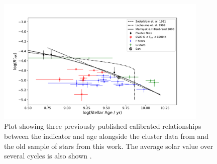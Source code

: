 \begin{figure}
    \centering
    \includegraphics[width=0.9\textwidth]{Figures/4-Chromospheric_age/ca_results_3_relationship.pdf}
    \caption[Comparison of sample to previous age--activity relationships]{Plot showing three previously published calibrated relationships between the \Rprime indicator and age \citep{Soderblom_etal_1991,Lachaume_etal_1999,Mamajek_Hillenbrand_2008} alongside the cluster data from \citet{Mamajek_Hillenbrand_2008} and the old sample of stars from this work. The average solar value over several cycles is also shown \citep{Egeland_etal_2017}.}
    \label{fig:comparison_previous_relationships_ca}
\end{figure}

